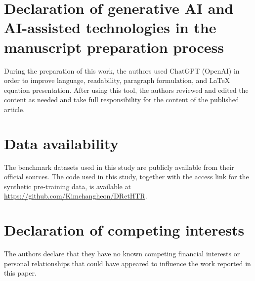 \documentclass[times, review, 10pt]{elsarticle}
\begin{document}
\section*{Declaration of generative AI and AI-assisted technologies in the manuscript preparation process}
During the preparation of this work, the authors used ChatGPT (OpenAI) in order to improve language, readability, paragraph formulation, and LaTeX equation presentation. After using this tool, the authors reviewed and edited the content as needed and take full responsibility for the content of the published article.

\section*{Data availability}
The benchmark datasets used in this study are publicly available from their official sources. The code used in this study, together with the access link for the synthetic pre-training data, is available at \href{https://github.com/Kimchangheon/DRetHTR}{https://github.com/Kimchangheon/DRetHTR}.

\section*{Declaration of competing interests}
The authors declare that they have no known competing financial interests or personal relationships that could have appeared to influence the work reported in this paper.

\begingroup
\setlength{\bibsep}{0pt plus 0.3ex}
\let\oldthebibliography\thebibliography
\renewcommand{\thebibliography}[1]{%
  \oldthebibliography{#1}%
  \setlength{\itemsep}{0pt plus 0.3ex}%
}
\begin{small} %


\end{small}
\endgroup
\end{document}
